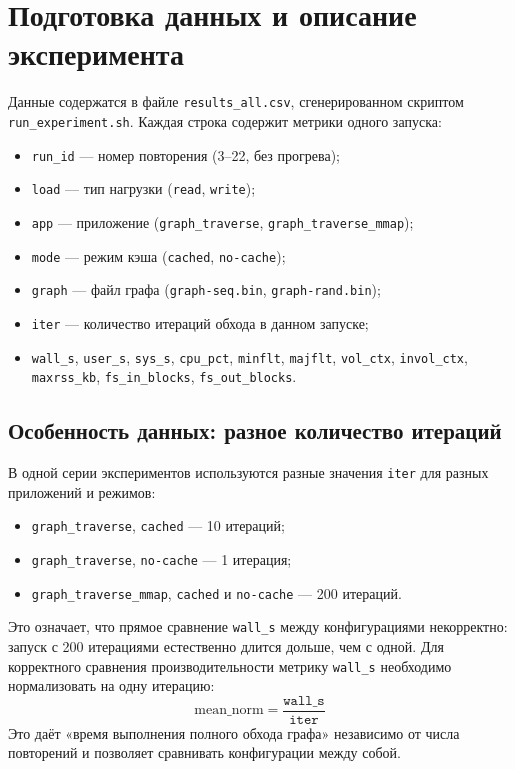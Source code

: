 \documentclass[12pt,a4paper]{article}
\begin{document}
\section{Подготовка данных и описание эксперимента}
Данные содержатся в файле \texttt{results\_all.csv}, сгенерированном скриптом \texttt{run\_experiment.sh}. Каждая строка содержит метрики одного запуска:
\begin{itemize}
    \item \texttt{run\_id} — номер повторения (3--22, без прогрева);
    \item \texttt{load} — тип нагрузки (\texttt{read}, \texttt{write});
    \item \texttt{app} — приложение (\texttt{graph\_traverse}, \texttt{graph\_traverse\_mmap});
    \item \texttt{mode} — режим кэша (\texttt{cached}, \texttt{no-cache});
    \item \texttt{graph} — файл графа (\texttt{graph-seq.bin}, \texttt{graph-rand.bin});
    \item \texttt{iter} — количество итераций обхода в данном запуске;
    \item \texttt{wall\_s}, \texttt{user\_s}, \texttt{sys\_s}, \texttt{cpu\_pct}, \texttt{minflt}, \texttt{majflt}, \texttt{vol\_ctx}, \texttt{invol\_ctx}, \texttt{maxrss\_kb}, \texttt{fs\_in\_blocks}, \texttt{fs\_out\_blocks}.
\end{itemize}

\subsection{Особенность данных: разное количество итераций}
В одной серии экспериментов используются разные значения \texttt{iter} для разных приложений и режимов:
\begin{itemize}
    \item \texttt{graph\_traverse}, \texttt{cached} — 10 итераций;
    \item \texttt{graph\_traverse}, \texttt{no-cache} — 1 итерация;
    \item \texttt{graph\_traverse\_mmap}, \texttt{cached} и \texttt{no-cache} — 200 итераций.
\end{itemize}
Это означает, что прямое сравнение \texttt{wall\_s} между конфигурациями некорректно: запуск с 200 итерациями естественно длится дольше, чем с одной. Для корректного сравнения производительности метрику \texttt{wall\_s} необходимо нормализовать на одну итерацию:
\[
    \text{mean\_norm} = \frac{\texttt{wall\_s}}{\texttt{iter}}
\]
Это даёт «время выполнения полного обхода графа» независимо от числа повторений и позволяет сравнивать конфигурации между собой.
\end{document}
